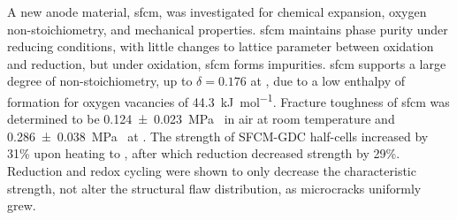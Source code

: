 A new anode material, \gls{sfcm}, was investigated for chemical expansion, oxygen non-stoichiometry, and mechanical properties.
\Gls{sfcm} maintains phase purity under reducing conditions, with little changes to lattice parameter between oxidation and reduction, but under oxidation, \gls{sfcm} forms  impurities.
\Gls{sfcm} supports a large degree of non-stoichiometry, up to $\delta = 0.176$  at , due to a low enthalpy of formation for oxygen vacancies of \SI{44.3}{\kilo\joule\per\mol}.
Fracture toughness of \gls{sfcm} was determined to be \SI[separate-uncertainty = true]{0.124 +- 0.023}{\mega\pascal{}} in air at room temperature and \SI[separate-uncertainty = true]{0.286 +- 0.038}{\mega\pascal{}} at .
The strength of SFCM-GDC half-cells increased by 31\% upon heating to , after which reduction decreased strength by 29\%.
Reduction and redox cycling were shown to only decrease the characteristic strength, not alter the structural flaw distribution, as microcracks uniformly grew.
